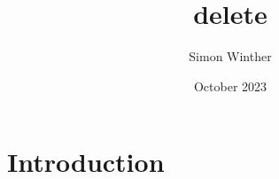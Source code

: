 \documentclass{article}
\title{delete}
\author{Simon Winther}
\date{October 2023}
\begin{document}
\maketitle

\section{Introduction}
\end{document}
